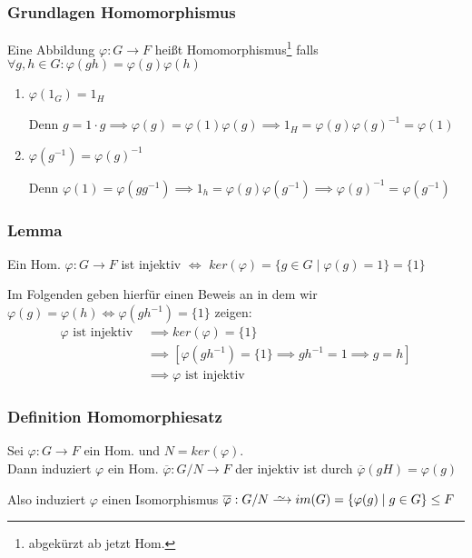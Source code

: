 \documentclass[12pt, german]{article}
\newcommand\iso{\xrightarrow{
		\,\smash{\raisebox{-0.65ex}{\ensuremath{\scriptstyle\sim}}}\,}}
\begin{document}
\subsubsection{Grundlagen Homomorphismus}
	Eine Abbildung $\varphi: G \to F$ heißt Homomorphismus\footnote{abgekürzt ab jetzt Hom.} falls $\forall g,h \in G : \varphi(gh) = \varphi(g)\varphi(h)$ \\
	\begin{enumerate}[label=\roman*)]
		\item $\varphi(1_G) = 1_H$ ~\par
			Denn $g=1\cdot g \implies \varphi(g)=\varphi(1)\varphi(g) \implies 1_H = \varphi(g) \varphi(g)^{-1} = \varphi(1)$
		
		\item $\varphi(g^{-1})=\varphi(g)^{-1}$ ~\par
			Denn $\varphi(1)=\varphi(gg^{-1}) \implies 1_h = \varphi(g)\varphi(g^{-1}) \implies \varphi(g)^{-1} = \varphi(g^{-1})$
	\end{enumerate}

\subsubsection{Lemma}
	Ein Hom. $\varphi: G \to F$ ist injektiv $\iff$ $ker(\varphi) = \{g \in G \mid \varphi(g)= 1\} = \{1\}$ 
	
	Im Folgenden geben hierfür einen Beweis an in dem wir $\varphi(g) = \varphi(h) \iff \varphi(gh^{-1}) = \{1\} $ zeigen:
	\begin{align*}
		\varphi \text{ ist injektiv } &\implies ker(\varphi) = \{1\} \\
		&\implies [\varphi(gh^{-1}) = \{1\} \implies gh^{-1} = 1 \implies g = h] \\ 
		&\implies \varphi \text{ ist injektiv}
	\end{align*}

\subsubsection{Definition Homomorphiesatz}
	Sei $\varphi: G \to F$ ein Hom.  und $N = ker(\varphi)$. \\
	Dann induziert $\varphi$ ein Hom. $\overline{\varphi} : G/N \to F$ der injektiv ist durch $\overline{\varphi}(gH) = \varphi(g)$ 
	\newline
	
	Also induziert $\varphi$ einen Isomorphismus $\overline{\varphi}: G/N \iso im(G) = \{\varphi(g) \mid g \in G\} \leq F$
\end{document}
